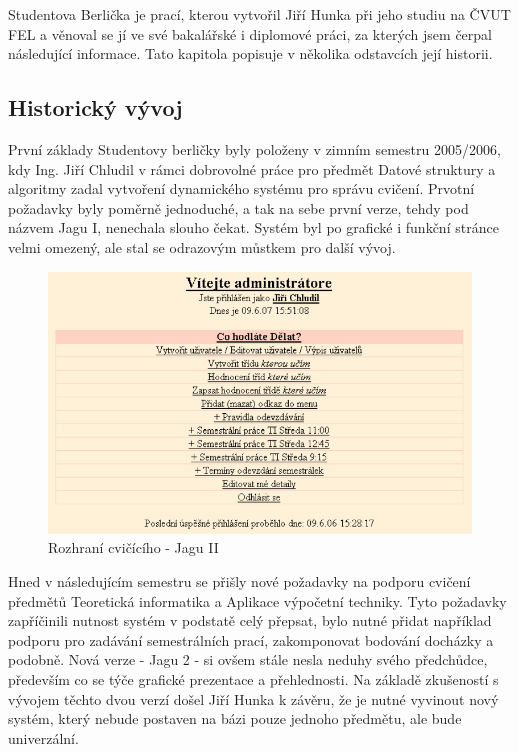 \documentclass[11pt,twoside,a4paper]{book}
\begin{document}
Studentova Berlička je prací, kterou vytvořil Jiří Hunka při jeho studiu na ČVUT FEL a věnoval se jí ve své bakalářské\cite{hunka:bp} i diplomové\cite{hunka:dp} práci, za kterých jsem čerpal následující informace. Tato kapitola popisuje v několika odstavcích její historii.

\subsection{Historický vývoj}
První základy Studentovy berličky byly položeny v zimním semestru 2005/2006, kdy Ing. Jiří Chludil v rámci dobrovolné práce pro předmět Datové struktury a algoritmy zadal vytvoření dynamického systému pro správu cvičení. Prvotní požadavky byly poměrně jednoduché, a tak na sebe první verze, tehdy pod názvem Jagu I, nenechala slouho čekat. Systém byl po grafické i funkční stránce velmi omezený, ale stal se odrazovým můstkem pro další vývoj.
\begin{figure}[h]
\begin{center}
\includegraphics[width=15cm]{figures/jaguI.png}
\caption{Rozhraní cvičícího - Jagu II}
\label{fig:jaguI}
\end{center}
\end{figure}

Hned v následujícím semestru se přišly nové požadavky na podporu cvičení předmětů Teoretická informatika a Aplikace výpočetní techniky. Tyto požadavky zapříčinili nutnost systém v podstatě celý přepsat, bylo nutné přidat například podporu pro zadávání semestrálních prací, zakomponovat bodování docházky a podobně. Nová verze - Jagu 2 - si ovšem stále nesla neduhy svého předchůdce, především co se týče grafické prezentace a přehlednosti. Na základě zkušeností s vývojem těchto dvou verzí došel Jiří Hunka k závěru, že je nutné vyvinout nový systém, který nebude postaven na bázi pouze jednoho předmětu, ale bude univerzální.
\end{document}
